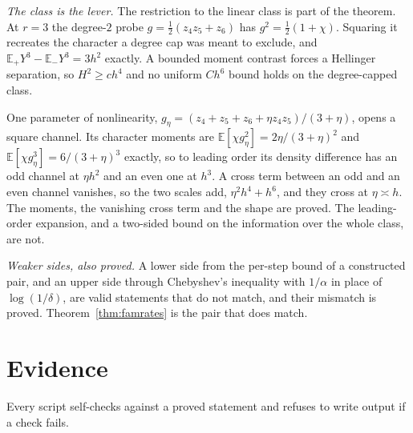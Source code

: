 \emph{The class is the lever.} The restriction to the linear class is part of the theorem. At
$r=3$ the degree-$2$ probe $g=\frac12(z_{4}z_{5}+z_{6})$ has $g^{2}=\frac12(1+\chi)$. Squaring it
recreates the character a degree cap was meant to exclude, and
$\mathbb{E}_{+}Y^{3}-\mathbb{E}_{-}Y^{3}=3h^{2}$ exactly. \CERT{} A bounded moment contrast forces a
Hellinger separation, so $H^{2}\ge ch^{4}$ and no uniform $Ch^{6}$ bound holds on the
degree-capped class.

 One parameter of nonlinearity,
$g_{\eta}=(z_{4}+z_{5}+z_{6}+\eta z_{4}z_{5})/(3+\eta)$, opens a square channel. Its character
moments are $\mathbb{E}[\chi g_{\eta}^{2}]=2\eta/(3+\eta)^{2}$ and $\mathbb{E}[\chi g_{\eta}^{3}]=6/(3+\eta)^{3}$
exactly, so to leading order its density difference has an odd channel at $\eta h^{2}$ and an
even one at $h^{3}$. A cross term between an odd and an even channel vanishes, so the two
scales add, $\eta^{2}h^{4}+h^{6}$, and they cross at $\eta\asymp h$. The moments, the vanishing cross
term and the shape are proved. The leading-order expansion, and a two-sided bound on the
information over the whole class, are not.


\emph{Weaker sides, also proved.} A lower side from the per-step bound of a constructed pair,
and an upper side through Chebyshev's inequality with $1/\alpha$ in place of $\log(1/\delta)$,
are valid statements that do not match, and their mismatch is proved.
Theorem~\ref{thm:famrates} is the pair that does match.


\section{Evidence}
\label{sec:evidence}

Every script self-checks against a proved statement and refuses to write output if a check
fails.

